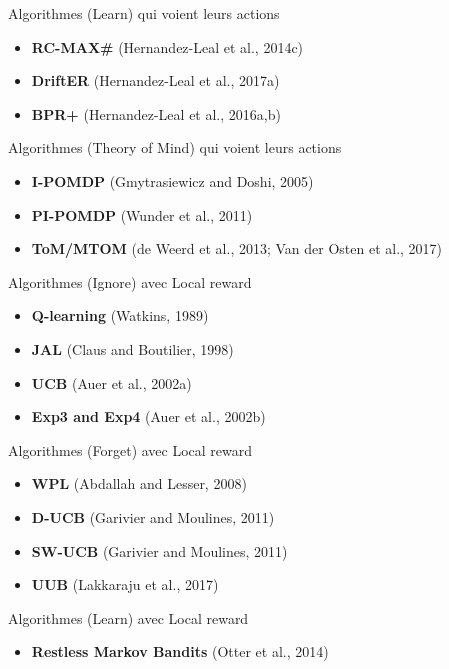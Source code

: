 \documentclass[aspectratio=169,xcolor=dvipsnames]{beamer}
\begin{document}
\begin{frame}{Algorithmes (Learn) qui voient leurs actions}
\begin{itemize}
    \item \textbf{RC-MAX\#} (Hernandez-Leal et al., 2014c)
    \item \textbf{DriftER} (Hernandez-Leal et al., 2017a)
    \item \textbf{BPR+} (Hernandez-Leal et al., 2016a,b)
\end{itemize}
\end{frame}

\begin{frame}{Algorithmes (Theory of Mind) qui voient leurs actions}
\begin{itemize}
    \item \textbf{I-POMDP} (Gmytrasiewicz and Doshi, 2005)
    \item \textbf{PI-POMDP} (Wunder et al., 2011)
    \item \textbf{ToM/MTOM} (de Weerd et al., 2013; Van der Osten et al., 2017)
\end{itemize}
\end{frame}

\begin{frame}{Algorithmes (Ignore) avec Local reward}
\begin{itemize}
    \item \textbf{Q-learning} (Watkins, 1989)
    \item \textbf{JAL} (Claus and Boutilier, 1998)
    \item \textbf{UCB} (Auer et al., 2002a)
    \item \textbf{Exp3 and Exp4} (Auer et al., 2002b)
\end{itemize}
\end{frame}

\begin{frame}{Algorithmes (Forget) avec Local reward}
\begin{itemize}
    \item \textbf{WPL} (Abdallah and Lesser, 2008)
    \item \textbf{D-UCB} (Garivier and Moulines, 2011)
    \item \textbf{SW-UCB} (Garivier and Moulines, 2011)
    \item \textbf{UUB} (Lakkaraju et al., 2017)
\end{itemize}
\end{frame}

\begin{frame}{Algorithmes (Learn) avec Local reward}
\begin{itemize}
    \item \textbf{Restless Markov Bandits} (Otter et al., 2014)
\end{itemize}
\end{frame}
\end{document}
